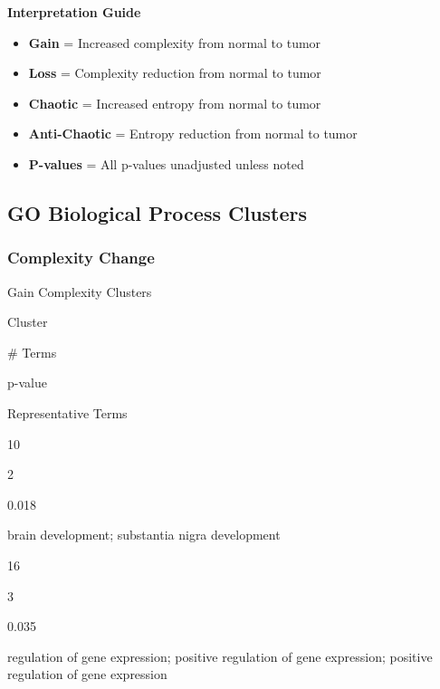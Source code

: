 \documentclass[
  letterpaper,
  DIV=11,
  numbers=noendperiod,
  openany,
  oneside]{scrreprt}
\providecommand{\tightlist}{%
  \setlength{\itemsep}{0pt}\setlength{\parskip}{0pt}}
\begin{document}
\begin{tcolorbox}[enhanced jigsaw, opacityback=0, colframe=quarto-callout-note-color-frame, toptitle=1mm, colback=white, breakable, toprule=.15mm, bottomrule=.15mm, opacitybacktitle=0.6, title=\textcolor{quarto-callout-note-color}{\faInfo}\hspace{0.5em}{Note}, coltitle=black, rightrule=.15mm, leftrule=.75mm, left=2mm, bottomtitle=1mm, titlerule=0mm, colbacktitle=quarto-callout-note-color!10!white, arc=.35mm]

\textbf{Interpretation Guide}

\begin{itemize}
\tightlist
\item
  \textbf{Gain} = Increased complexity from normal to tumor
\item
  \textbf{Loss} = Complexity reduction from normal to tumor
\item
  \textbf{Chaotic} = Increased entropy from normal to tumor
\item
  \textbf{Anti-Chaotic} = Entropy reduction from normal to tumor
\item
  \textbf{P-values} = All p-values unadjusted unless noted
\end{itemize}

\end{tcolorbox}

\subsection{GO Biological Process Clusters}

\subsubsection{Complexity Change}

Gain Complexity Clusters

Cluster

\# Terms

p-value

Representative Terms

10

2

0.018

brain development; substantia nigra development

16

3

0.035

regulation of gene expression; positive regulation of gene expression;
positive regulation of gene expression
\end{document}
